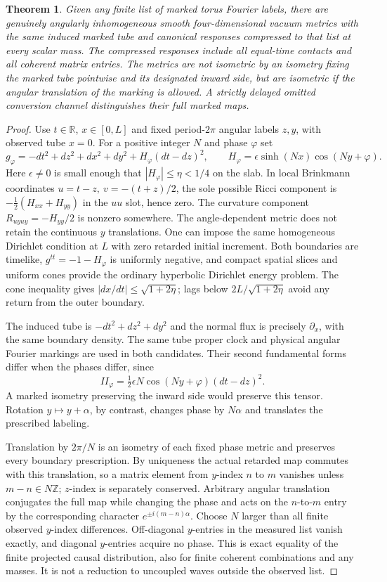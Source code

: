 \documentclass[11pt]{article}
\newtheorem{theorem}{Theorem}
\begin{document}
\begin{theorem}\label{thm:inhom}
Given any finite list of marked torus Fourier labels, there are genuinely angularly inhomogeneous smooth four-dimensional vacuum metrics with the same induced marked tube and canonical responses compressed to that list at every scalar mass. The compressed responses include all equal-time contacts and all coherent matrix entries. The metrics are not isometric by an isometry fixing the marked tube pointwise and its designated inward side, but are isometric if the angular translation of the marking is allowed. A strictly delayed omitted conversion channel distinguishes their full marked maps.
\end{theorem}
\begin{proof}
Use \(t\in\mathbb R\), \(x\in[0,L]\) and fixed period-\(2\pi\) angular labels \(z,y\), with observed tube \(x=0\). For a positive integer \(N\) and phase \(\varphi\) set
\[
 g_\varphi=-dt^2+dz^2+dx^2+dy^2+H_\varphi(dt-dz)^2,\qquad
 H_\varphi=\epsilon\sinh(Nx)\cos(Ny+\varphi).
\]
Here \(\epsilon\ne0\) is small enough that \(|H_\varphi|\le\eta<1/4\) on the slab. In local Brinkmann coordinates \(u=t-z,\ v=-(t+z)/2\), the sole possible Ricci component is \(-\tfrac12(H_{xx}+H_{yy})\) in the \(uu\) slot, hence zero. The curvature component \(R_{uyuy}=-H_{yy}/2\) is nonzero somewhere. The angle-dependent metric does not retain the continuous \(y\) translations. One can impose the same homogeneous Dirichlet condition at \(L\) with zero retarded initial increment. Both boundaries are timelike, \(g^{tt}=-1-H_\varphi\) is uniformly negative, and compact spatial slices and uniform cones provide the ordinary hyperbolic Dirichlet energy problem. The cone inequality gives \(|dx/dt|\le\sqrt{1+2\eta}\); lags below \(2L/\sqrt{1+2\eta}\) avoid any return from the outer boundary.

The induced tube is \(-dt^2+dz^2+dy^2\) and the normal flux is precisely \(\partial_x\), with the same boundary density. The same tube proper clock and physical angular Fourier markings are used in both candidates. Their second fundamental forms differ when the phases differ, since
\[
 II_\varphi=\tfrac12\epsilon N\cos(Ny+\varphi)(dt-dz)^2 .
\]
A marked isometry preserving the inward side would preserve this tensor. Rotation \(y\mapsto y+\alpha\), by contrast, changes phase by \(N\alpha\) and translates the prescribed labeling.

Translation by \(2\pi/N\) is an isometry of each fixed phase metric and preserves every boundary prescription. By uniqueness the actual retarded map commutes with this translation, so a matrix element from \(y\)-index \(n\) to \(m\) vanishes unless \(m-n\in N\mathbb Z\); \(z\)-index is separately conserved. Arbitrary angular translation conjugates the full map while changing the phase and acts on the \(n\)-to-\(m\) entry by the corresponding character \(e^{\pm i(m-n)\alpha}\). Choose \(N\) larger than all finite observed \(y\)-index differences. Off-diagonal \(y\)-entries in the measured list vanish exactly, and diagonal \(y\)-entries acquire no phase. This is exact equality of the finite projected causal distribution, also for finite coherent combinations and any masses. It is not a reduction to uncoupled waves outside the observed list.


\end{proof}
\end{document}
